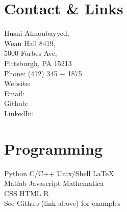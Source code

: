 \documentclass[]{deedy-resume-openfont}
\begin{document}
%
%

%
%


%
%

\begin{minipage}[t]{0.33\textwidth} 




\section{\color{Blue} Contact \& Links} 
Husni Almoubayyed,\\ 
Wean Hall 8419, \\ 5000 Forbes Ave, \\ Pittsburgh, PA 15213 \\
Phone: (412) 345 $-$ 1875 \\
Website: \href{https://www.husni.space}{} \\
Email: \href{mailto:husnial@cmu.edu}{} \\
Github: \href{https://github.com/hsnee}{} \\
LinkedIn:  \href{https://www.linkedin.com/in/husnialmoubayyed}{} 
\sectionsep




\section{\color{Blue} Programming}
\textbullet{} Python \textbullet{}  C/C++ \textbullet{} Unix/Shell \textbullet{} \LaTeX  \\
\textbullet{} Matlab \textbullet{} Javascript \textbullet{} Mathematica  \\
\textbullet{} CSS \textbullet{} HTML \textbullet{} R \\
See Github (link above) for examples
\sectionsep



\end{minipage}
\end{document}
